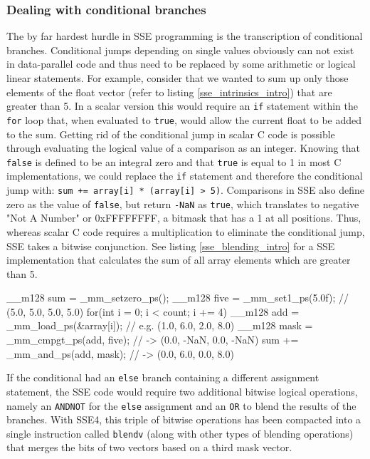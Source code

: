 \subsubsection{Dealing with conditional branches}
\label{conditional_branches} 
The by far hardest hurdle in SSE programming is the transcription of conditional branches. Conditional jumps depending on single values obviously can not exist in data-parallel code and thus need to be replaced by some arithmetic or logical linear statements. For example, consider that we wanted to sum up only those elements of the float vector (refer to listing \ref{sse_intrinsics_intro}) that are greater than 5. In a scalar version this would require an \texttt{if} statement within the \texttt{for} loop that, when evaluated to \texttt{true}, would allow the current float to be added to the sum. Getting rid of the conditional jump in scalar C code is possible through evaluating the logical value of a comparison as an integer. Knowing that \texttt{false} is defined to be an integral zero and that \texttt{true} is equal to 1 in most C implementations, we could replace the \texttt{if} statement and therefore the conditional jump with: \texttt{sum += array[i] * (array[i] > 5)}. Comparisons in SSE also define zero as the value of \texttt{false}, but return \texttt{-NaN} as \texttt{true}, which translates to negative "Not A Number" or 0xFFFFFFFF, a bitmask that has a 1 at all positions. Thus, whereas scalar C code requires a multiplication to eliminate the conditional jump, SSE takes a bitwise conjunction. See listing \ref{sse_blending_intro} for a SSE implementation that calculates the sum of all array elements which are greater than 5.

\begin{code}[caption={Sum of array elements greater than 5}, label=sse_blending_intro]
  __m128 sum = _mm_setzero_ps();
  __m128 five = _mm_set1_ps(5.0f); // (5.0, 5.0, 5.0, 5.0)
  for(int i = 0; i < count; i += 4) {
    __m128 add = _mm_load_ps(&array[i]); // e.g. (1.0, 6.0, 2.0, 8.0)
    __m128 mask = _mm_cmpgt_ps(add, five); // -> (0.0, -NaN, 0.0, -NaN)
    sum += _mm_and_ps(add, mask); // -> (0.0, 6.0, 0.0, 8.0)
  }
\end{code}

If the conditional had an \texttt{else} branch containing a different assignment statement, the SSE code would require two additional bitwise logical operations, namely an \texttt{ANDNOT} for the \texttt{else} assignment and an \texttt{OR} to blend the results of the branches. With SSE4, this triple of bitwise operations has been compacted into a single instruction called \texttt{blendv} (along with other types of blending operations) that merges the bits of two vectors based on a third mask vector. 


